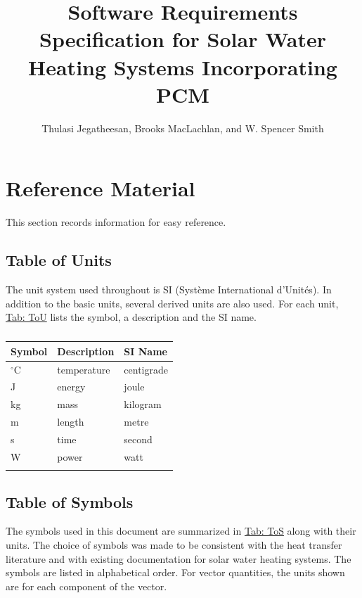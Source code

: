 \documentclass[12pt]{article}
\title{Software Requirements Specification for Solar Water Heating Systems Incorporating PCM}
\author{Thulasi Jegatheesan, Brooks MacLachlan, and W. Spencer Smith}
\begin{document}
\maketitle
\tableofcontents
\newpage
\section{Reference Material}
\label{Sec:RefMat}
This section records information for easy reference.

\subsection{Table of Units}
\label{Sec:ToU}
The unit system used throughout is SI (Système International d'Unités). In addition to the basic units, several derived units are also used. For each unit, \hyperref[Table:ToU]{Tab: ToU} lists the symbol, a description and the SI name.

\begin{longtable}{l l l}
\toprule
\textbf{Symbol} & \textbf{Description} & \textbf{SI Name}
\\
\midrule
\endhead
${}^{\circ}$C & temperature & centigrade
\\
J & energy & joule
\\
kg & mass & kilogram
\\
m & length & metre
\\
s & time & second
\\
W & power & watt
\\
\bottomrule
\caption{}
\label{Table:ToU}
\end{longtable}
\subsection{Table of Symbols}
\label{Sec:ToS}
The symbols used in this document are summarized in \hyperref[Table:ToS]{Tab: ToS} along with their units. The choice of symbols was made to be consistent with the heat transfer literature and with existing documentation for solar water heating systems. The symbols are listed in alphabetical order. For vector quantities, the units shown are for each component of the vector.
\end{document}
